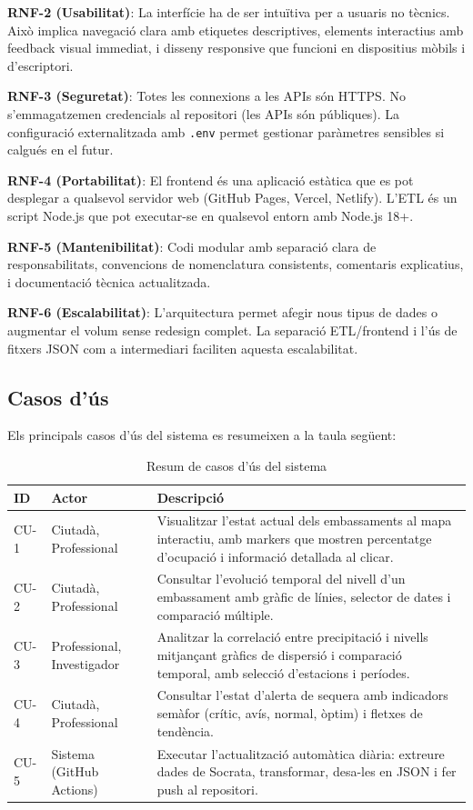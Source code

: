 \textbf{RNF-2 (Usabilitat)}: La interfície ha de ser intuïtiva per a usuaris no tècnics. Això implica navegació clara amb etiquetes descriptives, elements interactius amb feedback visual immediat, i disseny responsive que funcioni en dispositius mòbils i d'escriptori.

\textbf{RNF-3 (Seguretat)}: Totes les connexions a les APIs són HTTPS. No s'emmagatzemen credencials al repositori (les APIs són públiques). La configuració externalitzada amb \texttt{.env} permet gestionar paràmetres sensibles si calgués en el futur.

\textbf{RNF-4 (Portabilitat)}: El frontend és una aplicació estàtica que es pot desplegar a qualsevol servidor web (GitHub Pages, Vercel, Netlify). L'ETL és un script Node.js que pot executar-se en qualsevol entorn amb Node.js 18+.

\textbf{RNF-5 (Mantenibilitat)}: Codi modular amb separació clara de responsabilitats, convencions de nomenclatura consistents, comentaris explicatius, i documentació tècnica actualitzada.

\textbf{RNF-6 (Escalabilitat)}: L'arquitectura permet afegir nous tipus de dades o augmentar el volum sense redesign complet. La separació ETL/frontend i l'ús de fitxers JSON com a intermediari faciliten aquesta escalabilitat.


\subsection{Casos d'ús}

Els principals casos d'ús del sistema es resumeixen a la taula següent:

\begin{table}[h]
\centering
\caption{Resum de casos d'ús del sistema}
\begin{tabular}{|l|l|p{6cm}|}
\hline
\textbf{ID} & \textbf{Actor} & \textbf{Descripció} \\
\hline
CU-1 & Ciutadà, Professional & Visualitzar l'estat actual dels embassaments al mapa interactiu, amb markers que mostren percentatge d'ocupació i informació detallada al clicar. \\
\hline
CU-2 & Ciutadà, Professional & Consultar l'evolució temporal del nivell d'un embassament amb gràfic de línies, selector de dates i comparació múltiple. \\
\hline
CU-3 & Professional, Investigador & Analitzar la correlació entre precipitació i nivells mitjançant gràfics de dispersió i comparació temporal, amb selecció d'estacions i períodes. \\
\hline
CU-4 & Ciutadà, Professional & Consultar l'estat d'alerta de sequera amb indicadors semàfor (crític, avís, normal, òptim) i fletxes de tendència. \\
\hline
CU-5 & Sistema (GitHub Actions) & Executar l'actualització automàtica diària: extreure dades de Socrata, transformar, desa-les en JSON i fer push al repositori. \\
\hline
\end{tabular}
\end{table}

